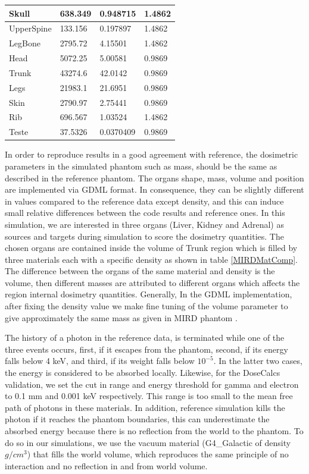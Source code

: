 \documentclass[letterpaper,12pt]{article}
\begin{document}
\begin{table}[H]
\begin{tabular}{llll}
Skull     & 638.349      & 0.948715     & 1.4862       \\\hline
UpperSpine     & 133.156      & 0.197897     & 1.4862       \\\hline
LegBone     & 2795.72      & 4.15501     & 1.4862       \\\hline
Head     & 5072.25      & 5.00581     & 0.9869       \\\hline
Trunk     & 43274.6      & 42.0142     & 0.9869       \\\hline
Legs     & 21983.1      & 21.6951     & 0.9869       \\\hline
Skin     & 2790.97      & 2.75441     & 0.9869       \\\hline
Rib     & 696.567      & 1.03524     & 1.4862       \\\hline
Teste     & 37.5326      & 0.0370409     & 0.9869\\ \hline
\end{tabular} 
\label{RegionImpleData}
\end{table}

In order to reproduce results in a good agreement with reference, the dosimetric parameters in the simulated phantom such as mass, should be the same as described in the reference phantom. The organs shape, mass, volume and position are implemented via GDML format. In consequence, they can be slightly different in values compared to the reference data except density, and this can induce small relative differences between the code results and reference ones. In this simulation, we are interested in three organs (Liver, Kidney and Adrenal) as sources and targets during simulation to score the dosimetry quantities. The chosen organs are contained inside the volume of Trunk region which is filled by three materials each with a specific density as shown in table \ref{MIRDMatComp}. The difference between the organs of the same material and density is the volume, then different masses are attributed to different organs which affects the region internal dosimetry quantities. Generally, In the GDML implementation, after fixing the density value we make fine tuning of the volume parameter to give approximately the same mass as given in MIRD phantom \cite{MIRDRefSAFData}.

The history of a photon in the reference data, is terminated while one of the three events occurs, first, if it escapes from the phantom, second, if its energy falls below 4 keV, and third, if its weight falls below $\mathrm{10}^{-5}$. In the latter two cases, the energy is considered to be absorbed locally. Likewise, for the DoseCalcs validation, we set the cut in range and energy threshold for gamma and electron to 0.1 mm and 0.001 keV respectively. This range is too small to the mean free path of photons in these materials. In addition, reference simulation kills the photon if it reaches the phantom boundaries, this can underestimate the absorbed energy because there is no reflection from the world to the phantom. To do so in our simulations, we use the vacuum material (G4\_Galactic of density $g/cm^3$) that fills the world volume, which reproduces the same principle of no interaction and no reflection in and from world volume.
\end{document}
